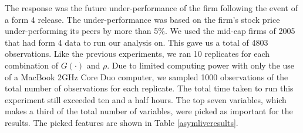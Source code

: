 \documentclass[twoside,11pt]{article}
\begin{document}
The response was the future under-performance of the firm following the event of a form 4 release. The under-performance was based on the firm's stock price under-performing its peers by more than 5\%. We used the mid-cap firms of 2005 that had form 4 data to run our analysis on. This gave us a total of 4803 observations. Like the previous experiments, we ran 10 replicates for each combination of $G(\cdot)$ and $\rho$. Due to limited computing power with only the use of a MacBook 2GHz Core Duo computer, we sampled 1000 observations of the total number of observations for each replicate. The total time taken to run this experiment still exceeded ten and a half hours. The top seven variables, which makes a third of the total number of variables, were picked as important for the results. The picked features are shown in Table \ref{asymliveresults}.
\end{document}
